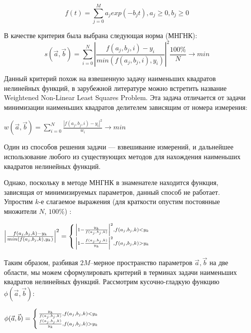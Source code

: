 \begin{equation}
  \label{eq:approximation}
  \mathit{ f(t)  = \displaystyle\sum_{j=0}^M a_j exp(-b_j t) , a_j \geq 0 , b_j \geq 0  }  
\end{equation}




В качестве критерия была выбрана следующая норма (МНГНК): 
\begin{equation}
	\label{eq:zuybin_petuhov}
	s(\vec{a}, \vec{b}) = \displaystyle\sum_{i=0}^N \left|
	\frac{f(a_j, b_j, i) - y_i}{min(f(a_j, b_j, i), y_i)}\right|^2 
	\frac{100\%}{N} \rightarrow min %
\end{equation}

Данный критерий похож на взвешенную задачу наименьших квадратов 
нелинейных функций, в зарубежной литературе можно встретить название 
Weightened Non-Linear Least Squares Problem. Эта задача отличается
от задачи минимизации наименьших квадратов делителем зависящим от номера измерения: 
\begin{center}
$w(\vec{a}, \vec{b}) = \displaystyle\sum_{i=0}^N \frac{\left|f(a_j, b_j, i) - y_i\right|^2}{w_i} \rightarrow min$
\end{center}
Один из способов решения задачи --- взвешивание измерений, и  дальнейшее использование любого из существующих методов для нахождения 
наименьших квадратов нелинейных функций.


Однако, поскольку в методе МНГНК в знаменателе 
находится функция, зависящая от минимизируемых параметров, 
данный способ не работает. Упростим $k$-е слагаемое выражения %
(для краткости опустим постоянные множители $N$, $100\%$) : 

\begin{center}
 \large{$ \left|\frac{f(a_j, b_j, k) - y_k}{min(f(a_j, b_j, k), y_k)}\right|^2 = \left\{ {
    \left| 1 - \frac{y_k}{f(a_j, b_j, k)}\right|^2 , f(a_j, b_j, k) < y_k  \atop 
    \left| 1 - \frac{f(a_j, b_j, k)}{y_k}\right|^2 , f(a_j, b_j, k) > y_k  
 } \right. $}
\end{center}

Таким образом, разбивая $ 2 M $--мерное пространство параметров $ \vec{a}, \vec{b}$ на две области, мы можем сформулировать 
критерий в терминах задачи наименьших квадратов нелинейных функций.
Рассмотрим кусочно-гладкую функцию $\phi(\vec{a}, \vec{b})$: 
\begin{center}
\large{$\phi(\vec{a}, \vec{b}) = \left\{ {
    \frac{y_k}{f(a_j, b_j, k)} , f(a_j, b_j, k) < y_k  \atop 
    \frac{f(a_j, b_j, k)}{y_k} , f(a_j, b_j, k) > y_k  
 } \right.$}
\end{center}

